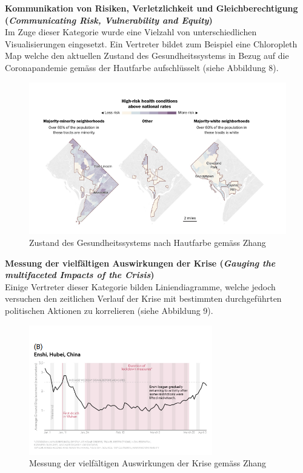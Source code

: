 \documentclass[12pt, oneside]{article}
\begin{document}
\clearpage
\textbf{Kommunikation von Risiken, Verletzlichkeit und Gleichberechtigung (\textit{Communicating Risk, Vulnerability and Equity})}\\
Im Zuge dieser Kategorie wurde eine Vielzahl von unterschiedlichen Visualisierungen eingesetzt. Ein Vertreter bildet zum Beispiel eine Chloropleth Map welche den aktuellen Zustand des Gesundheitssystems in Bezug auf die Coronapandemie gemäss der Hautfarbe aufschlüsselt (siehe Abbildung 8).


\begin{figure}[ht]
	\includegraphics[width=12cm]{images/communicating_equity_visualizations.png}
	\centering
	\caption{Zustand des Gesundheitssystems nach Hautfarbe gemäss Zhang ~\citep[S. 12]{YixuanZhang.}}
\end{figure}

\textbf{Messung der vielfältigen Auswirkungen der Krise (\textit{Gauging the multifaceted Impacts of the Crisis})}\\
Einige Vertreter dieser Kategorie bilden Liniendiagramme, welche jedoch versuchen den zeitlichen Verlauf der Krise mit bestimmten durchgeführten politischen Aktionen zu korrelieren (siehe Abbildung 9).

\begin{figure}[ht]
	\includegraphics[width=8cm]{images/measure_multifaceted_impact_visualizations.png}
	\centering
	\caption{Messung der vielfältigen Auswirkungen der Krise gemäss Zhang ~\citep[S. 14]{YixuanZhang.}}
\end{figure}
\end{document}
